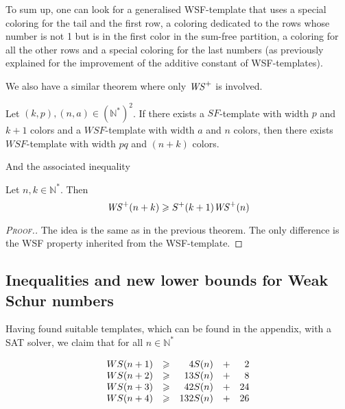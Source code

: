 \par
To sum up, one can look for a generalised WSF-template that uses a special coloring for the tail and the first row, a
coloring dedicated to the rows whose number is not 1 but is in the first color in the sum-free partition, a coloring for all
the other rows and a special coloring for the last numbers (as previously explained for the improvement of the additive
constant of WSF-templates).

We also have a similar theorem where only \(\mathit{WS}^+\) is involved.

\begin{theorem}
Let \((k,p), (n,a) \in (\mathbb{N}^*)^2\). If there exists a \(SF\)-template with width \(p\) and \(k+1\) colors and a 
\(WSF\)-template with width \(a\) and \(n\) colors, then there exists \(WSF\)-template with width \(pq\) and \((n+k)\)
 colors.
\end{theorem}

And the associated inequality

\begin{corollary}
Let \(n, k \in \mathbb{N}^*\). Then
\[
\mathit{WS}^+(n+k) \geqslant S^+(k+1) \mathit{WS}^+(n)
\]
\end{corollary}

\begin{proof}[\textsc{Proof.}]
The idea is the same as in the previous theorem. The only difference is the WSF property inherited
from the WSF-template.
\end{proof}



\subsection{Inequalities and new lower bounds for Weak Schur numbers}

\qquad Having found suitable templates, which can be found in the appendix, with a SAT solver, we claim that for all \(n \in
\mathbb{N}^*\)

\[
\begin{array}{r r r r r}
	WS(n + 1) & \geqslant & 4 S(n) & + & 2 \\
	WS(n + 2) & \geqslant & 13 S(n) & + & 8 \\
	WS(n + 3) & \geqslant & 42 S(n) & + & 24 \\
	WS(n + 4) & \geqslant & 132 S(n) & + & 26 \\
\end{array}
\]

